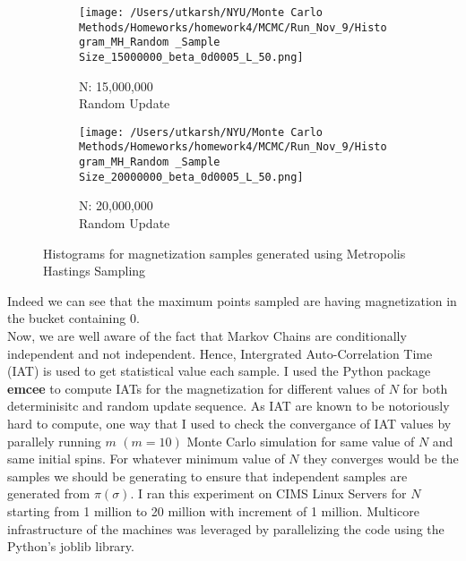 \documentclass[11pt]{article}
\begin{document}
\begin{figure}[H]
\begin{subfigure}{.22\textwidth}
        \texttt{[image: /Users/utkarsh/NYU/Monte Carlo Methods/Homeworks/homework4/MCMC/Run\_Nov\_9/Histogram\_MH\_Random \_Sample Size\_15000000\_beta\_0d0005\_L\_50.png]}
        \caption{N: 15,000,000\\Random Update}
    \end{subfigure}
    \begin{subfigure}{.22\textwidth}
        \texttt{[image: /Users/utkarsh/NYU/Monte Carlo Methods/Homeworks/homework4/MCMC/Run\_Nov\_9/Histogram\_MH\_Random \_Sample Size\_20000000\_beta\_0d0005\_L\_50.png]}
        \caption{N: 20,000,000\\Random Update}
    \end{subfigure} 
	\caption{Histograms for magnetization samples generated using Metropolis Hastings Sampling}
	\label{fig:histograms_mh}
\end{figure}


\noindent Indeed we can see that the maximum points sampled are having magnetization in the bucket containing $0$.\\
\noindent Now, we are well aware of the fact that Markov Chains are conditionally independent and not independent. Hence,
Intergrated Auto-Correlation Time (IAT) is used to get statistical value each sample. I used the Python package \textbf{emcee} to compute IATs for the magnetization for different values of $N$ for both determinisitc and random update sequence.
As IAT are known to be notoriously hard to compute, one way that I used to check the convergance of IAT values by parallely running $m$ $(m = 10)$ Monte Carlo simulation for same value of $N$ and same initial spins. For whatever minimum value of $N$ they converges
would be the samples we should be generating to ensure that independent samples are generated from $\pi(\sigma)$. I ran this experiment on CIMS Linux Servers for $N$ starting from 1 million to 20 million with increment of 1 million. Multicore infrastructure of the machines was leveraged by parallelizing
the code using the Python's joblib library.\\
\end{document}
